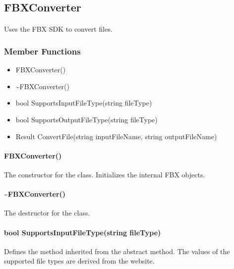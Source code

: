 \hypertarget{fileconversion_fbxconverter}
{
    \label{fileconversion_fbxconverter}
}

\subsection{FBXConverter}
    \paragraph{}
        Uses the FBX SDK to convert files.

    \subsubsection{Member Functions}

        \begin{itemize}
            \item FBXConverter()
            \item \textasciitilde FBXConverter()
            \item bool SupportsInputFileType(string fileType)
            \item bool SupportsOutputFileType(string fileType)
            \item Result ConvertFile(string inputFileName, string outputFileName)
        \end{itemize}

        \paragraph{FBXConverter()}
            \hfill \break
            The constructor for the class. Initializes the internal FBX objects.   
        
        \paragraph{\textasciitilde FBXConverter()}
            \hfill \break
            The destructor for the class.

        \paragraph{bool SupportsInputFileType(string fileType)}
            \hfill \break
            Defines the method inherited from the abstract method.  The values of the supported file types are derived from the website.

